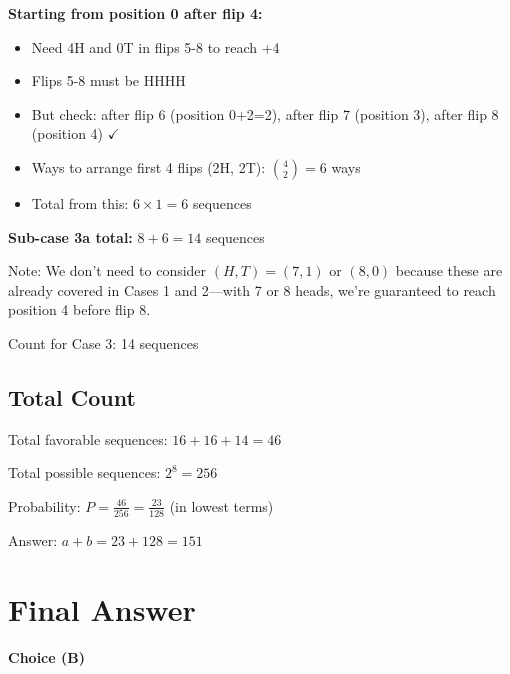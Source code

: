 \documentclass[]{article}
\begin{document}
\textbf{Starting from position 0 after flip 4:}
\begin{itemize}
    \item Need 4H and 0T in flips 5-8 to reach +4
    \item Flips 5-8 must be HHHH
    \item But check: after flip 6 (position 0+2=2), after flip 7 (position 3), after flip 8 (position 4) $\checkmark$
    \item Ways to arrange first 4 flips (2H, 2T): $\binom{4}{2} = 6$ ways
    \item Total from this: $6 \times 1 = 6$ sequences
\end{itemize}

\textbf{Sub-case 3a total:} $8 + 6 = 14$ sequences

Note: We don't need to consider $(H,T) = (7,1)$ or $(8,0)$ because these are already covered in Cases 1 and 2—with 7 or 8 heads, we're guaranteed to reach position 4 before flip 8.

Count for Case 3: 14 sequences

\subsection*{Total Count}

Total favorable sequences: $16 + 16 + 14 = 46$

Total possible sequences: $2^8 = 256$

Probability: $P = \frac{46}{256} = \frac{23}{128}$ (in lowest terms)

Answer: $a + b = 23 + 128 = \boxed{151}$

\section*{Final Answer}
 \quad \textbf{Choice (B)}
\end{document}

